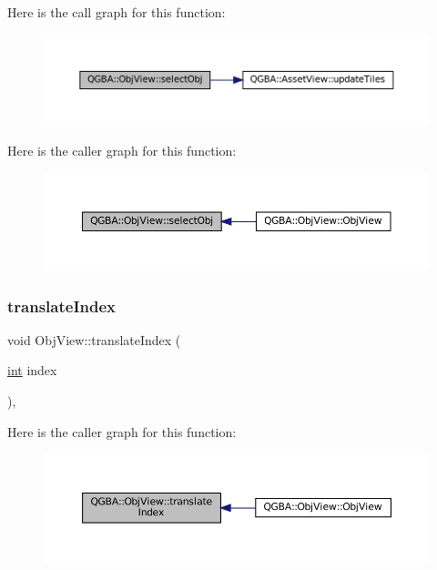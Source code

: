 Here is the call graph for this function\+:
\nopagebreak
\begin{figure}[H]
\begin{center}
\leavevmode
\includegraphics[width=350pt]{class_q_g_b_a_1_1_obj_view_a2f9e25964e38bf4060fe68878bf8a963_cgraph}
\end{center}
\end{figure}
Here is the caller graph for this function\+:
\nopagebreak
\begin{figure}[H]
\begin{center}
\leavevmode
\includegraphics[width=350pt]{class_q_g_b_a_1_1_obj_view_a2f9e25964e38bf4060fe68878bf8a963_icgraph}
\end{center}
\end{figure}
\mbox{\label{class_q_g_b_a_1_1_obj_view_a1255ade4d66e55d2996344fb71ac3d99}} 
\subsubsection{\texorpdfstring{translate\+Index}{translateIndex}}
{\footnotesize\ttfamily void Obj\+View\+::translate\+Index (\begin{DoxyParamCaption}\item[{\mbox{\hyperlink{ioapi_8h_a787fa3cf048117ba7123753c1e74fcd6}{int}}}]{index }\end{DoxyParamCaption})\hspace{0.3cm}{\ttfamily [private]}, {\ttfamily [slot]}}

Here is the caller graph for this function\+:
\nopagebreak
\begin{figure}[H]
\begin{center}
\leavevmode
\includegraphics[width=350pt]{class_q_g_b_a_1_1_obj_view_a1255ade4d66e55d2996344fb71ac3d99_icgraph}
\end{center}
\end{figure}


